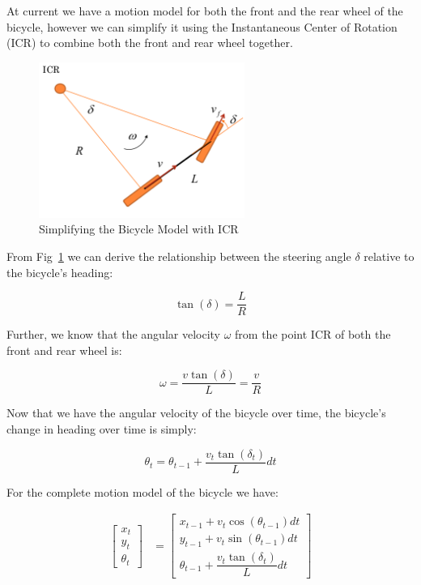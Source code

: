 \documentclass{article}
\begin{document}
At current we have a motion model for both the front and the rear wheel of the bicycle, however we can simplify it using the Instantaneous Center of Rotation (ICR) to combine both the front and rear wheel together.

\begin{figure}[H]
	\centering
	\includegraphics[width=0.6\textwidth]{images/bicycle_icr.png}
	\caption{Simplifying the Bicycle Model with ICR}
	\label{fig:bicycle_icr}
\end{figure}

From Fig~\ref{fig:bicycle_icr} we can derive the relationship between the steering angle $\delta$ relative to the bicycle's heading:

\begin{equation}
	\label{eq:icr_steering_angle}
	\tan(\delta) = \dfrac{L}{R}
\end{equation}

Further, we know that the angular velocity $\omega$ from the point ICR of both the front and rear wheel is:

\begin{equation}
	\label{eq:icr_angluar_velocity}
	\omega = \dfrac{v \tan(\delta)}{L} = \dfrac{v}{R}
\end{equation}

Now that we have the angular velocity of the bicycle over time, the bicycle's change in heading over time is simply:

\begin{equation}
	\theta_{t} = \theta_{t - 1} + \dfrac{v_{t} \tan(\delta_{t})}{L} dt
\end{equation}

For the complete motion model of the bicycle we have:

\begin{align}
 	\begin{bmatrix}
        x_{t} \\
        y_{t} \\
        \theta_{t}
    \end{bmatrix}  
    &=
    \begin{bmatrix}
	    x_{t - 1} + v_{t} \cos(\theta_{t - 1}) dt \\
		y_{t - 1} + v_{t} \sin(\theta_{t - 1}) dt \\
		\theta_{t - 1} + \dfrac{v_{t} \tan(\delta_{t})}{L} dt
    \end{bmatrix}
\end{align}
\end{document}
